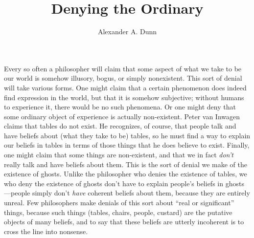 \documentclass[11pt]{article}
\title{Denying the Ordinary}
\author{Alexander A. Dunn}
\newenvironment{inq}{\vspace{0pt}%
	\begin{list}{}%
	{\setlength\labelwidth{0pt}%
	\setlength\leftmargin{2.5\oddsidemargin}%
	\setlength\rightmargin{\leftmargin}}
	\begin{spacing}{1}
	\item[]%
	}{
	\end{spacing}
	\end{list}
	\vspace{10pt}
	}
\begin{document}
\ifstandalone
\maketitle
\begin{spacing}{1.5}
\fi



\noindent Every so often a philosopher will claim that some aspect of what we take to be our world is somehow illusory, bogus, or simply nonexistent. This sort of denial will take various forms. One might claim that a certain phenomenon does indeed find expression in the world, but that it is somehow subjective; without humans to experience it, there would be no such phenomena. Or one might deny that some ordinary object of experience is actually non-existent. Peter van Inwagen claims that tables do not exist. He recognizes, of course, that people talk and have beliefs about (what they take to be) tables, so he must find a way to explain our beliefs in tables in terms of those things that he does believe to exist. Finally, one might claim that some things are non-existent, and that we in fact {\em don't} really talk and have beliefs about them. This is the sort of denial we make of the existence of ghosts. Unlike the philosopher who denies the existence of tables, we who deny the existence of ghosts don't have to explain people's beliefs in ghosts---people simply don't {\em have} coherent beliefs about them, because they are entirely unreal. Few philosophers make denials of this sort about ``real or significant'' things, because such things (tables, chairs, people, custard) are the putative objects of many beliefs, and to say that these beliefs are utterly incoherent is to cross the line into nonsense.%


\end{spacing}
\end{document}
